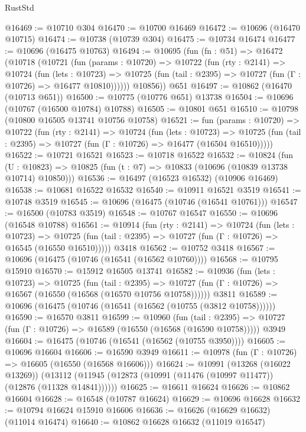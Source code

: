 \begin{lexlean}{RustStd}
\begin{coremodule}
@16469 := @10710 @304
@16470 := @10700 @16469
@16472 := @10696 (@16470 @10715)
@16474 := @10738 (@10739 @304)
@16475 := @10734 @16474
@16477 := @10696 (@16475 @10763)
@16494 := @10695
    (fun (fn : @51) =>
    @16472
      (@10718
        (@10721
          (fun (params : @10720) =>
          @10722
            (fun (rty : @2141) =>
            @10724
              (fun (lets : @10723) =>
              @10725 (fun (tail : @2395) => @10727 (fun (Γ : @10726) => @16477 @10810))))))
        @10856))
    @651
@16497 := @10862 (@16470 (@10713 @651))
@16500 := @10775 (@10776 @651) @13738
@16504 := @10696 (@10767 (@16500 @10784) @10788)
@16505 := @10801 @651
@16510 := @10798 (@10800 @16505 @13741 @10756 @10758)
@16521 := fun (params : @10720) =>
  @10722
    (fun (rty : @2141) =>
    @10724
      (fun (lets : @10723) =>
      @10725 (fun (tail : @2395) => @10727 (fun (Γ : @10726) => @16477 (@16504 @16510)))))
@16522 := @10721 @16521
@16523 := @10718 @16522
@16532 := @10824
    (fun (U : @10823) => @10825 (fun (t : @7) => @10833 (@10696 (@10839 @13738 @10714) @10850)))
@16536 := @16497 (@16523 @16532) (@10906 @16469)
@16538 := @10681 @16522 @16532
@16540 := @10911 @16521 @3519
@16541 := @10748 @3519
@16545 := @10696 (@16475 (@10746 (@16541 @10761)))
@16547 := @16500 (@10783 @3519)
@16548 := @10767 @16547
@16550 := @10696 (@16548 @10788)
@16561 := @10914
    (fun (rty : @2141) =>
    @10724
      (fun (lets : @10723) =>
      @10725 (fun (tail : @2395) => @10727 (fun (Γ : @10726) => @16545 (@16550 @16510)))))
    @3418
@16562 := @10752 @3418
@16567 := @10696 (@16475 (@10746 (@16541 (@16562 @10760))))
@16568 := @10795 @15910
@16570 := @15912 @16505 @13741
@16582 := @10936
    (fun (lets : @10723) =>
    @10725
      (fun (tail : @2395) =>
      @10727 (fun (Γ : @10726) => @16567 (@16550 (@16568 (@16570 @10756 @10758))))))
    @3811
@16589 := @10696 (@16475 (@10746 (@16541 (@16562 (@10755 (@3812 @10758))))))
@16590 := @16570 @3811
@16599 := @10960
    (fun (tail : @2395) => @10727 (fun (Γ : @10726) => @16589 (@16550 (@16568 (@16590 @10758)))))
    @3949
@16604 := @16475 (@10746 (@16541 (@16562 (@10755 @3950))))
@16605 := @10696 @16604
@16606 := @16590 @3949
@16611 := @10978 (fun (Γ : @10726) => @16605 (@16550 (@16568 @16606)))
@16624 := @10991
    (@13268 (@16022 @13269))
    (@13112 (@11945 (@12873 (@10991 (@11476 (@10997 @11477)) (@12876 (@11328 @14841))))))
@16625 := @16611 @16624
@16626 := @10862 @16604
@16628 := @16548 (@10787 @16624)
@16629 := @10696 @16628
@16632 := @10794 @16624 @15910 @16606
@16636 := @16626 (@16629 @16632) (@11014 @16474)
@16640 := @10862 @16628 @16632 (@11019 @16547)

\end{coremodule}
\end{lexlean}

